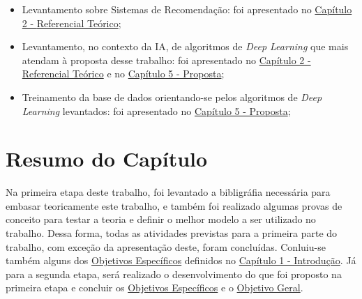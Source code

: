 \begin{itemize}
    \item Levantamento sobre Sistemas de Recomendação: foi apresentado no 
    \hyperref[chap:refteor]{Capítulo 2 - } \hyperref[chap:refteor]{Referencial Teórico};
    \item Levantamento, no contexto da IA, de algoritmos de \textit{Deep Learning} que mais atendam à proposta desse trabalho:
    foi apresentado no \hyperref[chap:refteor]{Capítulo 2 - Referencial Teórico} e no 
    \hyperref[chap:proposta]{Capítulo 5 - Proposta};
    \item Treinamento da base de dados orientando-se pelos algoritmos de \textit{Deep Learning} levantados:
    foi apresentado no \hyperref[chap:proposta]{Capítulo 5 - Proposta};
\end{itemize}

\section{Resumo do Capítulo}\label{sec:resumoconc}
Na primeira etapa deste trabalho, foi levantado a bibligráfia necessária para embasar teoricamente este trabalho, e também
foi realizado algumas provas de conceito para testar a teoria e definir o melhor modelo a ser utilizado no trabalho. Dessa forma,
todas as atividades previstas para a primeira parte do trabalho, com exceção da apresentação deste, foram concluídas. 
Conluiu-se também alguns dos \hyperref[subsec:objesp]{Objetivos Específicos} definidos no \hyperref[chap:intro]{Capítulo 1 - Introdução}.
Já para a segunda etapa, será realizado o desenvolvimento do que foi proposto na primeira etapa e concluir os 
\hyperref[subsec:objesp]{Objetivos Específicos} e o \hyperref[subsec:objgeral]{Objetivo Geral}.